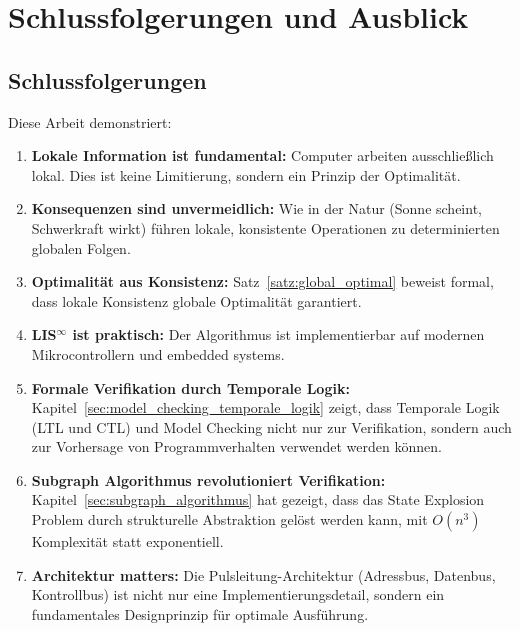 \documentclass[a4paper,12pt]{article}
\theoremstyle{definition}
\begin{document}
\section{Schlussfolgerungen und Ausblick}
\label{sec:schlussfolgerungen}

\subsection{Schlussfolgerungen}

Diese Arbeit demonstriert:

\begin{enumerate}
	\item \textbf{Lokale Information ist fundamental:} Computer arbeiten ausschließlich lokal. Dies ist keine Limitierung, sondern ein Prinzip der Optimalität.
	
	\item \textbf{Konsequenzen sind unvermeidlich:} Wie in der Natur (Sonne scheint, Schwerkraft wirkt) führen lokale, konsistente Operationen zu determinierten globalen Folgen.
	
	\item \textbf{Optimalität aus Konsistenz:} Satz~\ref{satz:global_optimal} beweist formal, dass lokale Konsistenz globale Optimalität garantiert.
	
	\item \textbf{LIS$^{\infty}$ ist praktisch:} Der Algorithmus ist implementierbar auf modernen Mikrocontrollern und embedded systems.
	
	\item \textbf{Formale Verifikation durch Temporale Logik:} Kapitel~\ref{sec:model_checking_temporale_logik} zeigt, dass Temporale Logik (LTL und CTL) und Model Checking nicht nur zur Verifikation, sondern auch zur Vorhersage von Programmverhalten verwendet werden können.
	
	\item \textbf{Subgraph Algorithmus revolutioniert Verifikation:} Kapitel~\ref{sec:subgraph_algorithmus} hat gezeigt, dass das State Explosion Problem durch strukturelle Abstraktion gelöst werden kann, mit $O(n^3)$ Komplexität statt exponentiell.
	
	\item \textbf{Architektur matters:} Die Pulsleitung-Architektur (Adressbus, Datenbus, Kontrollbus) ist nicht nur eine Implementierungsdetail, sondern ein fundamentales Designprinzip für optimale Ausführung.
\end{enumerate}
\end{document}
